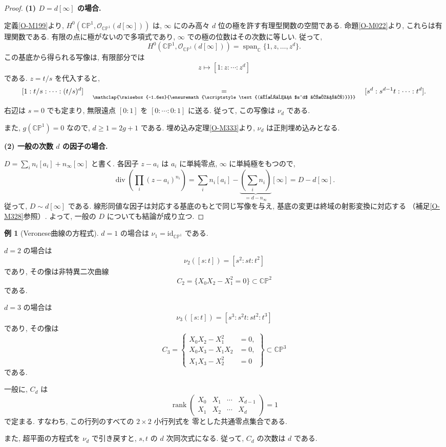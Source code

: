 \documentclass[dvipdfmx,a4paper,11pt]{article} %
\newcommand{\C}{\mathbb{C}}
\newcommand{\underalign}[2]{%
  \quad\underset{\mathclap{\raisebox{-1.6ex}{\ensuremath{\scriptstyle #1}}}}{#2}\quad
}
\theoremstyle{definition}
\numberwithin{equation}{section}
\newtheorem{exa}[thm]{例}
\begin{document}
\begin{proof}
\textbf{(1) $D=d[\infty]$ の場合.}

定義\ref{O-M199}より,
$H^0(\C\mathbb P^1,\mathcal O_{\C\mathbb P^1}(d[\infty]))$ は,
$\infty$ にのみ高々 $d$ 位の極を許す有理型関数の空間である.
命題\ref{O-M022}より, これらは有理関数である.
有限の点に極がないので多項式であり,
$\infty$ での極の位数はその次数に等しい.
従って,
\[
H^0(\C\mathbb P^1,\mathcal O_{\C\mathbb P^1}(d[\infty]))
=\operatorname{span}_{\C}\{1,z,\ldots,z^d\}.
\]
この基底から得られる写像は, 有限部分では
\begin{equation}\label{O-EQ113}
z\longmapsto[1:z:\cdots:z^d]
\end{equation}
である.
$z=t/s$ を代入すると,
\[
[1:t/s:\cdots:(t/s)^d]
\underalign{\text{(全成分に $s^d$ を掛ける)}}{=}
[s^d:s^{d-1}t:\cdots:t^d].
\]
右辺は $s=0$ でも定まり,
無限遠点 $[0:1]$ を $[0:\cdots:0:1]$ に送る.
従って, この写像は $\nu_d$ である.

また, $g(\C\mathbb P^1)=0$ なので,
$d\geq1=2g+1$ である.
埋め込み定理\ref{O-M333}より, $\nu_d$ は正則埋め込みとなる.

\medskip
\noindent
\textbf{(2) 一般の次数 $d$ の因子の場合.}

$D=\sum_i n_i[a_i]+n_\infty[\infty]$ と書く.
各因子 $z-a_i$ は $a_i$ に単純零点,
$\infty$ に単純極をもつので,
\[
\operatorname{div}\left(\prod_i(z-a_i)^{n_i}\right)
=\sum_i n_i[a_i]
-\underbrace{\left(\sum_i n_i\right)}_{=d-n_\infty}[\infty]
=D-d[\infty].
\]
従って, $D\sim d[\infty]$ である.
線形同値な因子は対応する基底のもとで同じ写像を与え,
基底の変更は終域の射影変換に対応する
（補足\ref{O-M328}参照）.
よって, 一般の $D$ についても結論が成り立つ.
\end{proof}


\begin{exa}[Veronese曲線の方程式]\label{O-M354}
$d=1$ の場合は $\nu_1=\mathrm{id}_{\C\mathbb P^1}$ である.

$d=2$ の場合は
\[
\nu_2([s:t])=[s^2:st:t^2]
\]
であり, その像は非特異二次曲線
\[
C_2=\{X_0X_2-X_1^2=0\}\subset\C\mathbb P^2
\]
である.

$d=3$ の場合は
\[
\nu_3([s:t])=[s^3:s^2t:st^2:t^3]
\]
であり, その像は
\[
C_3=
\left\{
\begin{aligned}
X_0X_2-X_1^2&=0,\\
X_0X_3-X_1X_2&=0,\\
X_1X_3-X_2^2&=0
\end{aligned}
\right\}
\subset\C\mathbb P^3
\]
である.

一般に, $C_d$ は
\begin{equation}\label{O-EQ114}
\operatorname{rank}
\begin{pmatrix}
X_0&X_1&\cdots&X_{d-1}\\
X_1&X_2&\cdots&X_d
\end{pmatrix}
=1
\end{equation}
で定まる.
すなわち, この行列のすべての $2\times2$ 小行列式を
零とした共通零点集合である.

また, 超平面の方程式を $\nu_d$ で引き戻すと, 
$s,t$ の $d$ 次同次式になる.
従って, $C_d$ の次数は $d$ である.
\end{exa}
\end{document}
